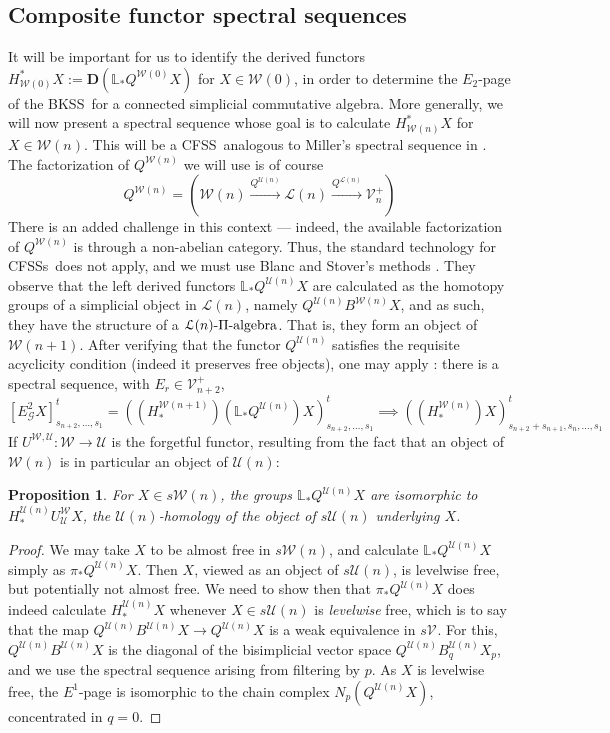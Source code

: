 \documentclass[11pt]{amsart} \renewcommand{\baselinestretch}{1.2}
\theoremstyle{plain}
\newtheorem{prop}[thm]{Proposition}
\numberwithin{equation}{section} %
\theoremstyle{plain}
\newtheorem{prop}[thm]{Proposition}
\numberwithin{equation}{chapter} %
\renewcommand{\to}{\longrightarrow}
\newcommand{\scrG}{\mathscr{G}}
\newcommand{\calU}{\mathcal{U}}
\newcommand{\calL}{\mathcal{L}}
\newcommand{\calV}{\mathcal{V}}
\newcommand{\calw}{\mathcal{W}}
\newcommand{\citeBOX}[2][]{\cite[\mbox{#1}]{#2}}
\newcommand{\vect}[2]{\calV^{#1}_{#2}}
\newcommand{\BSW}{{\scrG}}
\newcommand{\E}[5]{[E^{#1}_{#2}#3]^{#4}_{#5}}
\newcommand{\dual}{\mathbf{D}}
\newcommand{\BKSS}{BKSS}
\newcommand{\CFSS}{CFSS}
\newcommand{\CFSSs}{CFSSs}
\newcommand{\SectionOrChapter}[1]{\section{\textbf{#1}}}
\begin{document}
\begin{Comp funct sseqs}

\SectionOrChapter{Composite functor spectral sequences}
\label{Comp funct sseqs}
It will be important for us to identify the derived functors $H^*_{\calw(0)}X:=\dual(\mathbb{L}_*Q^{\calw(0)}X)$ for $X\in\calw(0)$, in order to determine the  $E_2$-page of the \BKSS\ for a connected simplicial commutative algebra. More generally, we will now present a spectral sequence whose goal is to calculate $H^*_{\calw(n)}X$ for $X\in\calw(n)$. This will be a \CFSS\ analogous to Miller's spectral sequence in \citeBOX[\S2]{MillerSullivanConjecture.pdf}. The factorization of $Q^{\calw(n)}$ we will use is of course 
\[Q^{\calw(n)}=\left(\calw(n)\overset{Q^{\calU(n)}}{\to}\calL(n)\overset{Q^{\calL(n)}}{\to}\vect{+}{n}\right)\]
There is an added challenge in this context --- indeed, the available factorization of $Q^{\calw(n)}$ is through a non-abelian category. Thus, the standard technology for \CFSSs\ does not apply, and we must use Blanc and Stover's methods \cite{Blanc_Stover-Groth_SS.pdf}. They observe that the left derived functors $\mathbb{L}_*Q^{\calU(n)}X$ are calculated as the homotopy groups of a simplicial object in $\calL(n)$, namely $Q^{\calU(n)}B^{\calw(n)}X$, and as such, they have the structure of a $\calL(n)\textup{-$\Pi$-algebra}$. That is, they form an object of $\calw(n+1)$.  After verifying that the functor $Q^{\calU(n)}$ satisfies the requisite acyclicity condition (indeed it preserves free objects), one may apply \cite[Theorem 4.4]{Blanc_Stover-Groth_SS.pdf}: there is a spectral sequence, with $E_r\in\vect{+}{n+2}$,
\[\E{2}{\BSW}{X}{t}{s_{n+2},\ldots,s_1}=((H_*^{\calw(n+1)})(\mathbb{L}_*Q^{\calU(n)})X)_{s_{n+2},\ldots,s_1}^t\implies ((H_*^{\calw(n)})X)_{s_{n+2}+s_{n+1},s_n,\ldots,s_1}^t\]
If $U^{\calw,\calU}:\calw\to\calU$ is the forgetful functor, resulting from the fact that an object of $\calw(n)$ is in particular an object of $\calU(n)$:
\begin{prop}
\label{what is LQU, dude?}
For $X\in s\calw(n)$, the groups $\mathbb{L}_*Q^{\calU(n)}X$ are isomorphic to $H_*^{\calU(n)}U^{\calw}_{\calU}X$, the $\calU(n)$-homology of the object of $s\calU(n)$ underlying $X$.
\end{prop}
\begin{proof}
We may take $X$ to be almost free in $s\calw(n)$, and calculate $\mathbb{L}_*Q^{\calU(n)}X$ simply as $\pi_*Q^{\calU(n)}X$. Then $X$, viewed as an object of $s\calU(n)$, is levelwise free, but potentially not almost free. We need to show then that $\pi_*Q^{\calU(n)}X$ does indeed calculate $H_*^{\calU(n)}X$ whenever $X\in s\calU(n)$ is \emph{levelwise} free, which is to say that the map $Q^{\calU(n)}B^{\calU(n)}X\to Q^{\calU(n)}X$ is a weak equivalence in $s\vect{}{}$. For this, $Q^{\calU(n)}B^{\calU(n)}X$ is the diagonal of the bisimplicial vector space $Q^{\calU(n)}B_q^{\calU(n)}X_p$, and we use the spectral sequence arising from filtering by $p$. As $X$ is levelwise free, the $E^1$-page is isomorphic to the chain complex $N_p(Q^{\calU(n)}X)$, concentrated in $q=0$.

\end{proof}
\end{Comp funct sseqs}
\end{document}
